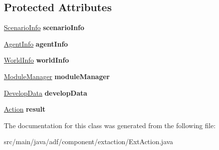 \subsection*{Protected Attributes}
\begin{DoxyCompactItemize}
\item 
\hypertarget{classadf_1_1component_1_1extaction_1_1ExtAction_a6fbc25311a85d78fa3f49e9264d657b8}{}\label{classadf_1_1component_1_1extaction_1_1ExtAction_a6fbc25311a85d78fa3f49e9264d657b8} 
\hyperlink{classadf_1_1agent_1_1info_1_1ScenarioInfo}{Scenario\+Info} {\bfseries scenario\+Info}
\item 
\hypertarget{classadf_1_1component_1_1extaction_1_1ExtAction_a06db73f1d9fffdf42af9fccae0a6e2d1}{}\label{classadf_1_1component_1_1extaction_1_1ExtAction_a06db73f1d9fffdf42af9fccae0a6e2d1} 
\hyperlink{classadf_1_1agent_1_1info_1_1AgentInfo}{Agent\+Info} {\bfseries agent\+Info}
\item 
\hypertarget{classadf_1_1component_1_1extaction_1_1ExtAction_a641f11ee5304c24ffabcc452830261e7}{}\label{classadf_1_1component_1_1extaction_1_1ExtAction_a641f11ee5304c24ffabcc452830261e7} 
\hyperlink{classadf_1_1agent_1_1info_1_1WorldInfo}{World\+Info} {\bfseries world\+Info}
\item 
\hypertarget{classadf_1_1component_1_1extaction_1_1ExtAction_a9d41b6d5cf350972b6b6dd9343162cfe}{}\label{classadf_1_1component_1_1extaction_1_1ExtAction_a9d41b6d5cf350972b6b6dd9343162cfe} 
\hyperlink{classadf_1_1agent_1_1module_1_1ModuleManager}{Module\+Manager} {\bfseries module\+Manager}
\item 
\hypertarget{classadf_1_1component_1_1extaction_1_1ExtAction_a628aa58b77cb5ec94fe56f6f20f6c019}{}\label{classadf_1_1component_1_1extaction_1_1ExtAction_a628aa58b77cb5ec94fe56f6f20f6c019} 
\hyperlink{classadf_1_1agent_1_1develop_1_1DevelopData}{Develop\+Data} {\bfseries develop\+Data}
\item 
\hypertarget{classadf_1_1component_1_1extaction_1_1ExtAction_a10762c84b9058147d4e9e4813a4f6466}{}\label{classadf_1_1component_1_1extaction_1_1ExtAction_a10762c84b9058147d4e9e4813a4f6466} 
\hyperlink{classadf_1_1agent_1_1action_1_1Action}{Action} {\bfseries result}
\end{DoxyCompactItemize}


The documentation for this class was generated from the following file\+:\begin{DoxyCompactItemize}
\item 
src/main/java/adf/component/extaction/Ext\+Action.\+java\end{DoxyCompactItemize}
